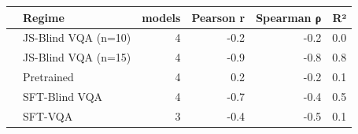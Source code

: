 \begin{tabular}{llrrrr}
\toprule
 & Regime & models & Pearson r & Spearman ρ & R² \\
\midrule 
& JS-Blind VQA (n=10) & 4 & -0.2 & -0.2 & 0.0 \\
& JS-Blind VQA (n=15) & 4 & -0.9 & -0.8 & 0.8 \\
& Pretrained & 4 & 0.2 & -0.2 & 0.1 \\
& SFT-Blind VQA & 4 & -0.7 & -0.4 & 0.5 \\
& SFT-VQA & 3 & -0.4 & -0.5 & 0.1 \\
\bottomrule
\end{tabular}
